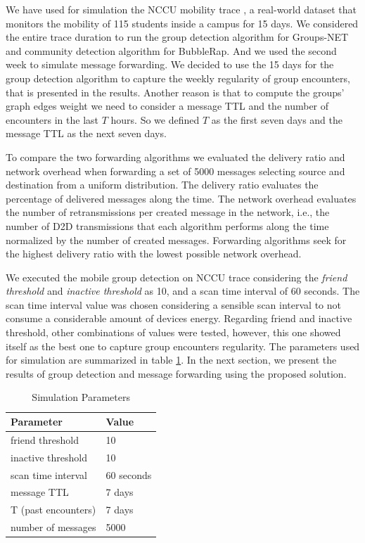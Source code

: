 We have used for simulation the NCCU mobility trace \citep{tsai2015nccu}, a real-world dataset that monitors the mobility of 115 students inside a campus for 15 days. We considered the entire trace duration to run the group detection algorithm for Groups-NET and community detection algorithm for BubbleRap. And we used the second week to simulate message forwarding. We decided to use the 15 days for the group detection algorithm to capture the weekly regularity of group encounters, that is presented in the results. Another reason is that to compute the groups' graph edges weight we need to consider a message TTL and the number of encounters in the last $T$ hours. So we defined $T$ as the first seven days and the message TTL as the next seven days.

To compare the two forwarding algorithms we evaluated the delivery ratio and network overhead when forwarding a set of 5000 messages selecting source and destination from a uniform distribution. The delivery ratio evaluates the percentage of delivered messages along the time. The network overhead evaluates the number of retransmissions per created message in the network, i.e., the number of D2D transmissions that each algorithm performs along the time normalized by the number of created messages. Forwarding algorithms seek for the highest delivery ratio with the lowest possible network overhead.

We executed the mobile group detection on NCCU trace considering the \textit{friend threshold} and \textit{inactive threshold} as 10, and a scan time interval of 60 seconds. The scan time interval value was chosen considering a sensible scan interval to not consume a considerable amount of devices energy. Regarding friend and inactive threshold, other combinations of values were tested, however, this one showed itself as the best one to capture group encounters regularity. The parameters used for simulation are summarized in table \ref{tab:groupsNetParameters}. In the next section, we present the results of group detection and message forwarding using the proposed solution.

\begin{table}[H]
    \centering
    \caption{Simulation Parameters}
    \label{tab:groupsNetParameters}
    \begin{tabular}{|l|l|}
    \hline
    \textbf{Parameter}  & \textbf{Value} \\ \hline
    friend threshold    & 10             \\ \hline
    inactive threshold  & 10             \\ \hline
    scan time interval  & 60 seconds     \\ \hline
    message TTL         & 7 days         \\ \hline
    T (past encounters) & 7 days         \\ \hline
    number of messages  & 5000           \\ \hline
    \end{tabular}
    \end{table}

